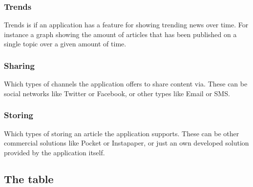 \subsubsection{Trends}
Trends is if an application has a feature for showing trending news over time. For instance a graph showing the amount of articles that has been published on a single topic over a given amount of time.


\subsubsection{Sharing}
Which types of channels the application offers to share content via. These can be social networks like Twitter or Facebook, or other types like Email or SMS.

\subsubsection{Storing}
Which types of storing an article the application supports. These can be other commercial solutions like Pocket or Instapaper, or just an own developed solution provided by the application itself.


\subsection{The table}

